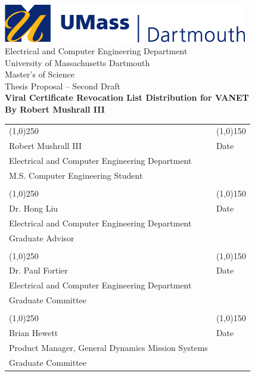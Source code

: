 \documentclass {article}
\begin{document}
\begin{titlepage}
	\centering
	\includegraphics[width=0.8\textwidth]{images/umd_logo.jpg} \\ \bigskip
	\LARGE{Electrical and Computer Engineering Department \\University of Massachusetts Dartmouth}\\
	\bigskip 
	\LARGE{Master's of Science \\ Thesis Proposal -- Second Draft} \\
	\bigskip 
	\Huge{\bf Viral Certificate Revocation List Distribution for VANET} \\ \medskip
	\LARGE{\bf By Robert Mushrall III}

	\vfill
	\begin{table}[!hb]
		\centering
		\begin{tabular}{ l l }
			\line(1,0){250} & \line(1,0){150} \\
			\small{Robert Mushrall III}  & \small{Date} \\
			\small{Electrical and Computer Engineering Department} \\
			\small{M.S. Computer Engineering Student} & \\
			\vspace{.3cm} \\
			\line(1,0){250} & \line(1,0){150} \\
			\small{Dr. Hong Liu} & \small{Date} \\
			\small{Electrical and Computer Engineering Department} \\
			\small{Graduate Advisor} & \\
			\vspace{.3cm} \\
			\line(1,0){250} & \line(1,0){150} \\
			\small{Dr. Paul Fortier} & \small{Date} \\
			\small{Electrical and Computer Engineering Department} \\
			\small{Graduate Committee} & \\
			\vspace{.3cm} \\
			\line(1,0){250} & \line(1,0){150} \\
			\small{Brian Hewett} & \small{Date} \\
			\small{Product Manager, General Dynamics Mission Systems} \\
			\small{Graduate Committee} & \\
		\end{tabular}
	\end{table}
	\thispagestyle{empty}
\end{titlepage}
\setcounter{page}{2}
\end{document}
